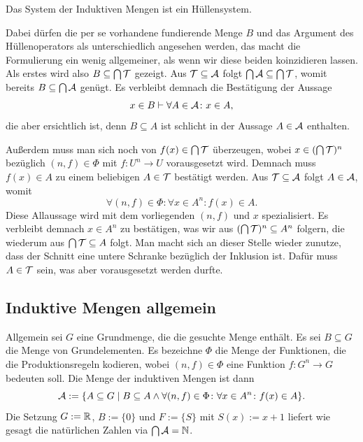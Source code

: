 \begin{Satz}
Das System der Induktiven Mengen ist ein Hüllensystem.
\end{Satz}
\begin{Beweis}
Dabei dürfen die per se vorhandene fundierende Menge $B$ und das
Argument des Hüllenoperators als unterschiedlich angesehen werden, das
macht die Formulierung ein wenig allgemeiner, als wenn wir diese beiden
koinzidieren lassen.
Als erstes wird also $B\subseteq\bigcap\mathcal{T}$
gezeigt. Aus $\mathcal{T}\subseteq\mathcal{A}$ folgt
$\bigcap\mathcal{A}\subseteq\bigcap\mathcal{T}$, womit
bereits $B\subseteq\bigcap\mathcal{A}$ genügt. Es verbleibt demnach
die Bestätigung der Aussage
\[x\in B\vdash\forall A\in\mathcal{A}\colon x\in A,\]
die aber ersichtlich ist, denn $B\subseteq A$ ist schlicht in der
Aussage $A\in\mathcal{A}$ enthalten.

Außerdem muss man sich noch von $f(x)\in\bigcap\mathcal{T}$ überzeugen,
wobei $x\in (\bigcap\mathcal{T})^n$ bezüglich $(n,f)\in\Phi$ mit
$f\colon U^n\to U$ vorausgesetzt wird. Demnach muss $f(x)\in A$
zu einem beliebigen $A\in\mathcal{T}$ bestätigt werden. Aus
$\mathcal{T}\subseteq\mathcal{A}$ folgt $A\in\mathcal{A}$, womit
\[\forall (n,f)\in\Phi\colon\forall x\in A^n\colon f(x)\in A.\]
Diese Allaussage wird mit dem vorliegenden $(n,f)$ und $x$
spezialisiert. Es verbleibt demnach $x\in A^n$ zu bestätigen, was wir
aus $(\bigcap\mathcal{T})^n\subseteq A^n$ folgern, die wiederum aus
$\bigcap\mathcal{T}\subseteq A$ folgt. Man macht sich an dieser
Stelle wieder zunutze, dass der Schnitt eine untere Schranke bezüglich
der Inklusion ist. Dafür muss $A\in\mathcal{T}$ sein, was aber
vorausgesetzt werden durfte.\,\qedsymbol
\end{Beweis}

\subsection{Induktive Mengen allgemein}

Allgemein sei $G$ eine Grundmenge, die die gesuchte Menge enthält.
Es sei $B\subseteq G$ die Menge von Grundelementen.
Es bezeichne $\Phi$ die Menge der Funktionen, die die Produktionsregeln kodieren,
wobei $(n,f)\in\Phi$ eine Funktion $f\colon G^n\to G$ bedeuten soll.
Die Menge der induktiven Mengen ist dann
\[\mathcal{A} := \{A\subseteq G\mid B\subseteq A\land
\forall (n,f)\in\Phi\colon\forall x\in A^n\colon f(x)\in A\}.\]
Die Setzung $G:=\mathbb R$, $B:=\{0\}$ und $F:=\{S\}$ mit $S(x):=x+1$
liefert wie gesagt die natürlichen Zahlen via $\bigcap\mathcal{A} = \mathbb N$.

